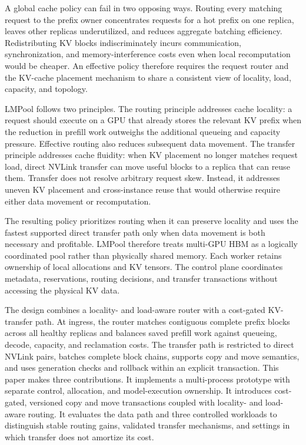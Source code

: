 \documentclass{article}
\newcommand{\sys}{LMPool}
\begin{document}
A global cache policy can fail in two opposing ways. Routing every matching request to the prefix owner concentrates requests for a hot prefix on one replica, leaves other replicas underutilized, and reduces aggregate batching efficiency. Redistributing KV blocks indiscriminately incurs communication, synchronization, and memory-interference costs even when local recomputation would be cheaper. An effective policy therefore requires the request router and the KV-cache placement mechanism to share a consistent view of locality, load, capacity, and topology.

\sys{} follows two principles. The routing principle addresses cache locality: a request should execute on a GPU that already stores the relevant KV prefix when the reduction in prefill work outweighs the additional queueing and capacity pressure. Effective routing also reduces subsequent data movement. The transfer principle addresses cache fluidity: when KV placement no longer matches request load, direct NVLink transfer can move useful blocks to a replica that can reuse them. Transfer does not resolve arbitrary request skew. Instead, it addresses uneven KV placement and cross-instance reuse that would otherwise require either data movement or recomputation.

The resulting policy prioritizes routing when it can preserve locality and uses the fastest supported direct transfer path only when data movement is both necessary and profitable. \sys{} therefore treats multi-GPU HBM as a logically coordinated pool rather than physically shared memory. Each worker retains ownership of local allocations and KV tensors. The control plane coordinates metadata, reservations, routing decisions, and transfer transactions without accessing the physical KV data.

The design combines a locality- and load-aware router with a cost-gated KV-transfer path. At ingress, the router matches contiguous complete prefix blocks across all healthy replicas and balances saved prefill work against queueing, decode, capacity, and reclamation costs. The transfer path is restricted to direct NVLink pairs, batches complete block chains, supports copy and move semantics, and uses generation checks and rollback within an explicit transaction. This paper makes three contributions. It implements a multi-process prototype with separate control, allocation, and model-execution ownership. It introduces cost-gated, versioned copy and move transactions coupled with locality- and load-aware routing. It evaluates the data path and three controlled workloads to distinguish stable routing gains, validated transfer mechanisms, and settings in which transfer does not amortize its cost.
\end{document}
